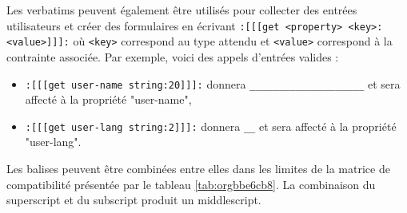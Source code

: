 \documentclass[a4paper,12pt]{article}
\begin{document}
Les verbatims peuvent également être utilisés pour collecter des entrées utilisateurs et créer des formulaires en écrivant \texttt{:[[[get <property> <key>:<value>]]]:} où \texttt{<key>} correspond au type attendu et \texttt{<value>} correspond à la contrainte associée. Par exemple, voici des appels d'entrées valides :
\begin{itemize}
\item \texttt{:[[[get user-name string:20]]]:} donnera \texttt{\_\_\_\_\_\_\_\_\_\_\_\_\_\_\_\_\_\_\_\_} et sera affecté à la propriété "user-name",
\item \texttt{:[[[get user-lang string:2]]]:} donnera \texttt{\_\_} et sera affecté à la propriété "user-lang".
\end{itemize}

Les balises peuvent être combinées entre elles dans les limites de la matrice de compatibilité présentée par le tableau \ref{tab:orgbbe6cb8}. La combinaison du superscript et du subscript produit un middlescript.
\end{document}
